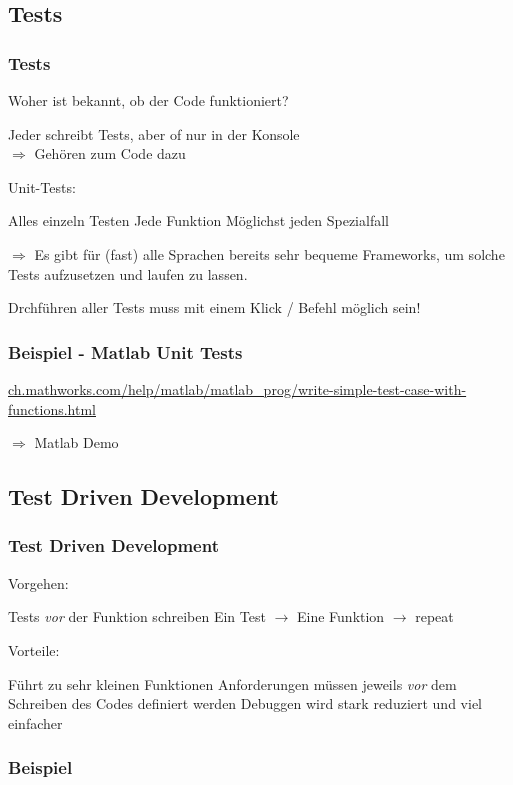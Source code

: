 \documentclass[handout]{beamer}
\begin{document}
\subsection{Tests}
\begin{frame}
    \frametitle{Tests}
    Woher ist bekannt, ob der Code funktioniert?\pause

    Jeder schreibt Tests, aber of nur in der Konsole\\
    $\Rightarrow$ Gehören zum Code dazu

    \vspace{1em}\pause Unit-Tests:
    \begin{outline}
        \1 Alles einzeln Testen
            \2 Jede Funktion
            \2 Möglichst jeden Spezialfall
    \end{outline}
    $\Rightarrow$ Es gibt für (fast) alle Sprachen bereits sehr bequeme
    Frameworks, um solche Tests aufzusetzen und laufen zu lassen.

    \vspace{1em} \color{red} Drchführen aller Tests muss mit einem Klick
/ Befehl möglich sein!
\end{frame}
\begin{frame}
    \frametitle{Beispiel - Matlab Unit Tests}
    \url{ch.mathworks.com/help/matlab/matlab_prog/write-simple-test-case-with-functions.html}
    \vspace{2em}

    $\Rightarrow$ Matlab Demo
\end{frame}
\subsection{Test Driven Development}
\begin{frame}
    \frametitle{Test Driven Development}
    Vorgehen:

    \begin{outline}
        \1 Tests \emph{vor} der Funktion schreiben
        \1 Ein Test $\rightarrow$ Eine Funktion $\rightarrow$ repeat
    \end{outline}\pause

    Vorteile:

    \begin{outline}
        \1 Führt zu sehr kleinen Funktionen
        \1 Anforderungen müssen jeweils \emph{vor} dem Schreiben des Codes
        definiert werden
        \1 Debuggen wird stark reduziert und viel einfacher
    \end{outline}
\end{frame}
\begin{frame}
    \frametitle{Beispiel}
\end{frame}
\end{document}
